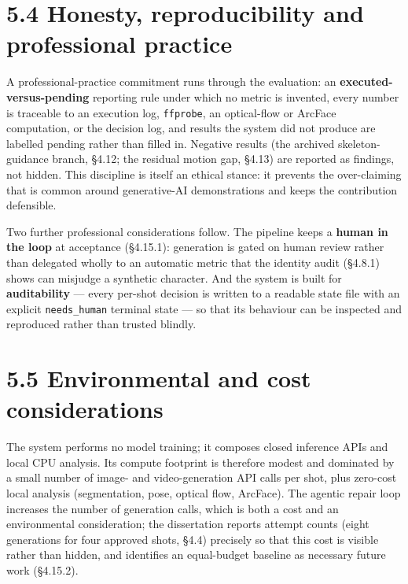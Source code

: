 \documentclass[10pt,twocolumn,letterpaper]{article}
\begin{document}

\section*{5.4 Honesty, reproducibility and professional practice}

A professional-practice commitment runs through the evaluation: an \textbf{executed-versus-pending} reporting rule under which no metric is invented, every number is traceable to an execution log, \texttt{ffprobe}, an optical-flow or ArcFace computation, or the decision log, and results the system did not produce are labelled pending rather than filled in. Negative results (the archived skeleton-guidance branch, \S{}4.12; the residual motion gap, \S{}4.13) are reported as findings, not hidden. This discipline is itself an ethical stance: it prevents the over-claiming that is common around generative-AI demonstrations and keeps the contribution defensible.

Two further professional considerations follow. The pipeline keeps a \textbf{human in the loop} at acceptance (\S{}4.15.1): generation is gated on human review rather than delegated wholly to an automatic metric that the identity audit (\S{}4.8.1) shows can misjudge a synthetic character. And the system is built for \textbf{auditability} --- every per-shot decision is written to a readable state file with an explicit \texttt{needs\_human} terminal state --- so that its behaviour can be inspected and reproduced rather than trusted blindly.


\section*{5.5 Environmental and cost considerations}

The system performs no model training; it composes closed inference APIs and local CPU analysis. Its compute footprint is therefore modest and dominated by a small number of image- and video-generation API calls per shot, plus zero-cost local analysis (segmentation, pose, optical flow, ArcFace). The agentic repair loop increases the number of generation calls, which is both a cost and an environmental consideration; the dissertation reports attempt counts (eight generations for four approved shots, \S{}4.4) precisely so that this cost is visible rather than hidden, and identifies an equal-budget baseline as necessary future work (\S{}4.15.2).
\end{document}
